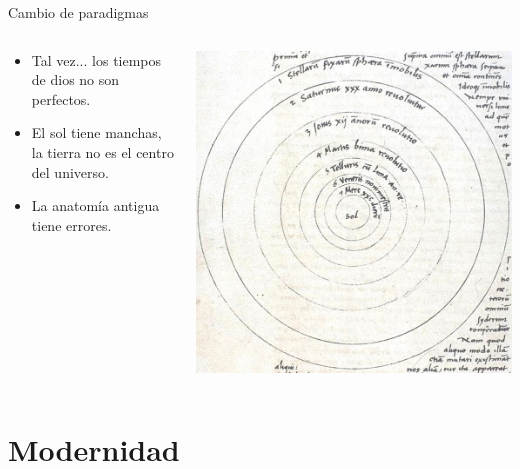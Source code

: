 \documentclass{beamer}
\begin{document}
\begin{frame}{Cambio de paradigmas}
\transfade
\begin{columns}
\begin{column}{0.5\textwidth}
   \begin{itemize}
    \item Tal vez... los tiempos de dios no son perfectos.
    \pause
    \item El sol tiene manchas, la tierra no es el centro del universo. 
    \pause
    \item La anatomía antigua tiene errores.
\end{itemize}
\end{column}
\begin{column}{0.5\textwidth}  %
    \begin{center}
     \includegraphics[width=1\textwidth]{heliocentrism.jpg}
     \end{center}
\end{column}
\end{columns}
\end{frame}

\section{Modernidad}
\end{document}
